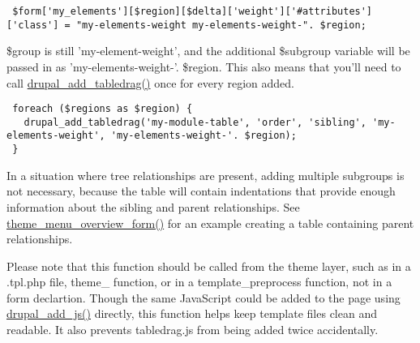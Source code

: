 \begin{Code}\begin{verbatim} $form['my_elements'][$region][$delta]['weight']['#attributes']['class'] = "my-elements-weight my-elements-weight-". $region;
\end{verbatim}
\end{Code}



\$group is still 'my-element-weight', and the additional \$subgroup variable will be passed in as 'my-elements-weight-'. \$region. This also means that you'll need to call \hyperlink{common_8inc_b905af5d90a84b5d48f3a517992875f5}{drupal\_\-add\_\-tabledrag()} once for every region added.



\begin{Code}\begin{verbatim} foreach ($regions as $region) {
   drupal_add_tabledrag('my-module-table', 'order', 'sibling', 'my-elements-weight', 'my-elements-weight-'. $region);
 }
\end{verbatim}
\end{Code}



In a situation where tree relationships are present, adding multiple subgroups is not necessary, because the table will contain indentations that provide enough information about the sibling and parent relationships. See \hyperlink{group__themeable_g4af0d13e1a7fdd7c08283101bbed6d2c}{theme\_\-menu\_\-overview\_\-form()} for an example creating a table containing parent relationships.

Please note that this function should be called from the theme layer, such as in a .tpl.php file, theme\_\- function, or in a template\_\-preprocess function, not in a form declartion. Though the same JavaScript could be added to the page using \hyperlink{common_8inc_a20ac74a08756427706432aa6bb33139}{drupal\_\-add\_\-js()} directly, this function helps keep template files clean and readable. It also prevents tabledrag.js from being added twice accidentally.

